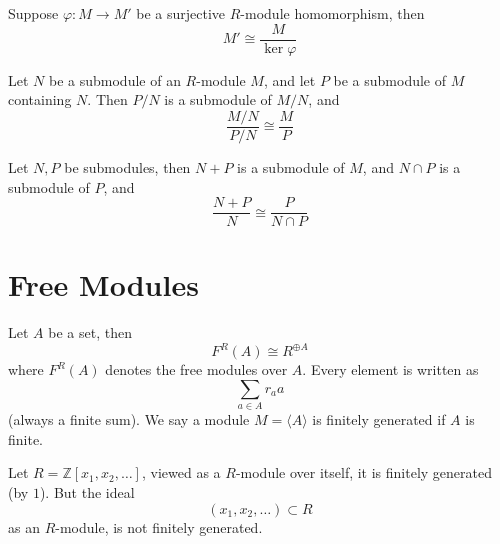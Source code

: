 \documentclass[openany]{book}
\newcommand{\Z}{\mathbb{Z}}
\newcommand{\la}{\langle}
\newcommand{\ra}{\rangle}
\begin{document}
\begin{thm}
    Suppose $\varphi: M\to M'$ be a surjective $R$-module homomorphism, then 
    \begin{equation*}
        M'\cong\frac{M}{\ker\varphi}
    \end{equation*}
\end{thm}

\begin{prop}
    Let $N$ be a submodule of an $R$-module $M$, and let $P$ be a submodule of $M$ containing $N$. Then $P/N$ is a submodule of $M/N$, and 
    \begin{equation*}
        \frac{M/N}{P/N}\cong\frac{M}{P}
    \end{equation*}
\end{prop}

\begin{prop}
    Let $N,P$ be submodules, then $N+P$ is a submodule of $M$, and $N\cap P$ is a submodule of $P$, and 
    \begin{equation*}
        \frac{N+P}{N}\cong\frac{P}{N\cap P}
    \end{equation*}
\end{prop}


\section{Free Modules}

\begin{defn}
    Let $A$ be a set, then 
    \begin{equation*}
        F^R(A)\cong R^{\oplus A}
    \end{equation*}
    where $F^R(A)$ denotes the free modules over $A$. Every element is written as 
    \begin{equation*}
        \sum_{a\in A}r_aa
    \end{equation*}
    (always a finite sum). We say a module $M=\la A\ra$ is finitely generated if $A$ is finite.
\end{defn}

\begin{example}
    Let $R=\Z[x_1,x_2, \dots]$, viewed as a $R$-module over itself, it is finitely generated (by $1$). 
    But the ideal 
    \begin{equation*}
        (x_1,x_2,\dots)\subset R
    \end{equation*}
    as an $R$-module, is not finitely generated. 
\end{example}
\end{document}
